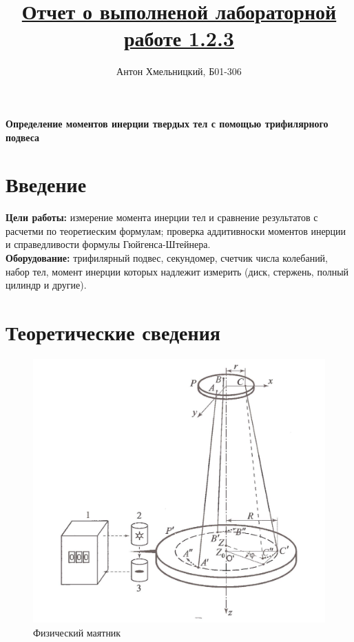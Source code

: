 \documentclass[a4paper]{article}
\title{\underline{Отчет о выполненой лабораторной работе 1.2.3}}
\author{Антон Хмельницкий, Б01-306}
\begin{document}
\maketitle

\begin{center}
\textbf{\Large Определение моментов инерции твердых тел с помощью трифилярного подвеса}
\end{center}


	\section{Введение}
	\textbf{Цели работы:} измерение момента инерции тел и сравнение результатов с расчетми по теоретиеским формулам; проверка аддитивноски моментов инерции и справедливости формулы Гюйгенса-Штейнера.\\
	\textbf{Оборудование:} трифилярный подвес, секундомер, счетчик числа колебаний, набор тел, момент инерции которых надлежит измерить (диск, стержень, полный цилиндр и другие).
	
	\section{Теоретические сведения}
	
	\begin{figure}
		\includegraphics[width=0.95\linewidth]{foto.jpg}
		\caption{Физический маятник}\label{risunok}
	\end{figure}
	
\end{document}
